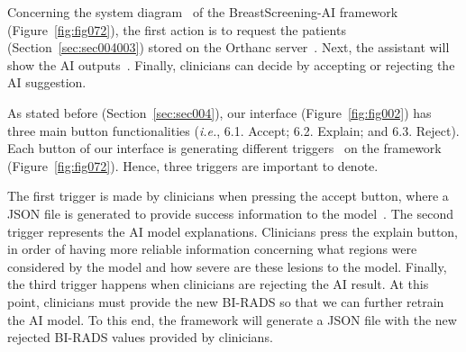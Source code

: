 Concerning the system diagram~\cite{mourao2020architecture} of the BreastScreening-AI framework (Figure~\ref{fig:fig072}), the first action is to request the patients (Section~\ref{sec:sec004003}) stored on the Orthanc server~\cite{Jodogne2018}.
Next, the assistant will show the AI outputs~\cite{10.13140/RG.2.2.12519.16803, nadia2020xai}.
Finally, clinicians can decide by accepting or rejecting the AI suggestion.

As stated before (Section~\ref{sec:sec004}), our interface (Figure~\ref{fig:fig002}) has three main button functionalities ({\it i.e.}, 6.1. Accept; 6.2. Explain; and 6.3. Reject).
Each button of our interface is generating different triggers~\cite{10.1145/3436954} on the framework (Figure~\ref{fig:fig072}).
Hence, three triggers are important to denote.



The first trigger is made by clinicians when pressing the accept button, where a JSON file is generated to provide success information to the model~\cite{10.13140/rg.2.2.14792.55049}.
The second trigger represents the AI model explanations.
Clinicians press the explain button, in order of having more reliable information concerning what regions were considered by the model and how severe are these lesions to the model.
Finally, the third trigger happens when clinicians are rejecting the AI result.
At this point, clinicians must provide the new BI-RADS so that we can further retrain the AI model.
To this end, the framework will generate a JSON file with the new rejected BI-RADS values provided by clinicians.
